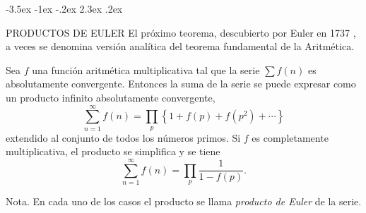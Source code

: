 \documentclass[12pt,a4paper]{book}
\makeatletter
\renewcommand\section{\@startsection{section}{1}{\z@}%
  {-3.5ex \@plus -1ex \@minus -.2ex}%
  {2.3ex \@plus .2ex}%
  {\normalfont\Large\bfseries\raggedright}}
\makeatother
\begin{document}
    \section{PRODUCTOS DE EULER}
    El próximo teorema, descubierto por Euler en 1737 \cite{euler1737}, a veces se denomina versión analítica
    del teorema fundamental de la Aritmética.

    \begin{teorema}\label{teo:11-6}
        Sea $f$ una función aritmética multiplicativa tal que la serie $\sum f(n)$ es
        absolutamente convergente. Entonces la suma de la serie se puede expresar como un
        producto infinito absolutamente convergente,
        \begin{equation}\label{eq:11-6}
            \sum_{n=1}^{\infty}f(n)=\prod_{p}\left\{1+f(p)+f(p^{2})+\cdots\right\}
        \end{equation}
        extendido al conjunto de todos los números primos. Si $f$ es completamente
        multiplicativa, el producto se simplifica y se tiene
        \begin{equation}\label{eq:11-7}
            \sum_{n=1}^{\infty}f(n)=\prod_{p}\frac{1}{1-f(p)}.
        \end{equation}
    \end{teorema}

    Nota. En cada uno de los casos el producto se llama \textit{producto de Euler} de la
    serie.
\end{document}

